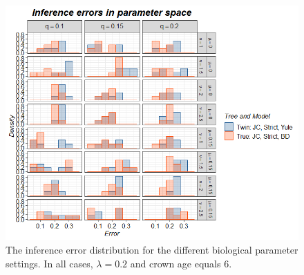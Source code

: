 \begin{figure}[!htbp]
  \includegraphics[width=\textwidth]{razzo_results.png}
  \caption{
    The inference error distribution 
    for the different biological
    parameter settings. In all cases, $\lambda = 0.2$ and 
    crown age equals 6. 
  }
  \label{fig:results}
\end{figure}
